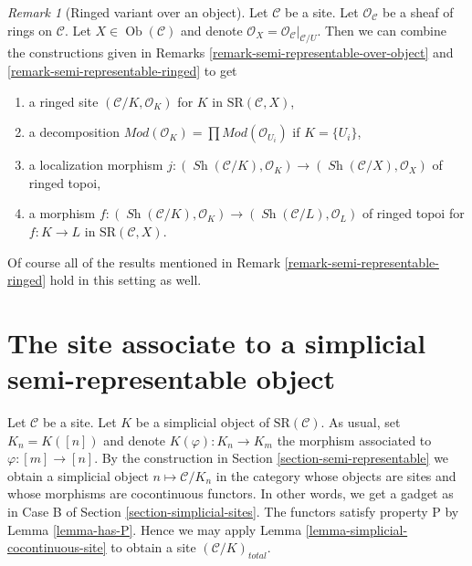 \documentclass[10pt,a4paper]{amsart}
\theoremstyle{plain}
\theoremstyle{definition}
\theoremstyle{remark}
\newtheorem{remark}[subsection]{Remark}
\numberwithin{equation}{subsection}
\def\Ob{\mathop{\mathrm{Ob}}\nolimits}
\def\Sh{\mathop{\mathit{Sh}}\nolimits}
\begin{document}
\begin{remark}[Ringed variant over an object]
\label{remark-semi-representable-ringed-over-object}
Let $\mathcal{C}$ be a site. Let $\mathcal{O}_\mathcal{C}$
be a sheaf of rings on $\mathcal{C}$. Let $X \in \Ob(\mathcal{C})$
and denote $\mathcal{O}_X = \mathcal{O}_\mathcal{C}|_{\mathcal{C}/U}$.
Then we can combine the constructions given in
Remarks \ref{remark-semi-representable-over-object}
and \ref{remark-semi-representable-ringed} to get
\begin{enumerate}
\item a ringed site $(\mathcal{C}/K, \mathcal{O}_K)$
for $K$ in $\text{SR}(\mathcal{C}, X)$,
\item a decomposition
$\textit{Mod}(\mathcal{O}_K) =
\prod \textit{Mod}(\mathcal{O}_{U_i})$ if $K = \{U_i\}$,
\item a localization morphism
$j : (\Sh(\mathcal{C}/K), \mathcal{O}_K) \to
(\Sh(\mathcal{C}/X), \mathcal{O}_X)$
of ringed topoi,
\item a morphism
$f : (\Sh(\mathcal{C}/K), \mathcal{O}_K) \to
(\Sh(\mathcal{C}/L), \mathcal{O}_L)$ of ringed topoi
for $f : K \to L$ in $\text{SR}(\mathcal{C}, X)$.
\end{enumerate}
Of course all of the results mentioned in
Remark \ref{remark-semi-representable-ringed}
hold in this setting as well.
\end{remark}





\section{The site associate to a simplicial semi-representable object}
\label{section-simplicial-semi-representable}

\noindent
Let $\mathcal{C}$ be a site. Let $K$ be a simplicial object of
$\text{SR}(\mathcal{C})$. As usual, set $K_n = K([n])$ and denote
$K(\varphi) : K_n \to K_m$ the morphism associated to $\varphi : [m] \to [n]$.
By the construction in
Section \ref{section-semi-representable} we obtain a simplicial object
$n \mapsto \mathcal{C}/K_n$ in the category whose objects are sites and
whose morphisms are cocontinuous functors. In other words, we get
a gadget as in Case B of Section \ref{section-simplicial-sites}.
The functors satisfy property P by Lemma \ref{lemma-has-P}.
Hence we may apply
Lemma \ref{lemma-simplicial-cocontinuous-site}
to obtain a site $(\mathcal{C}/K)_{total}$.
\end{document}
